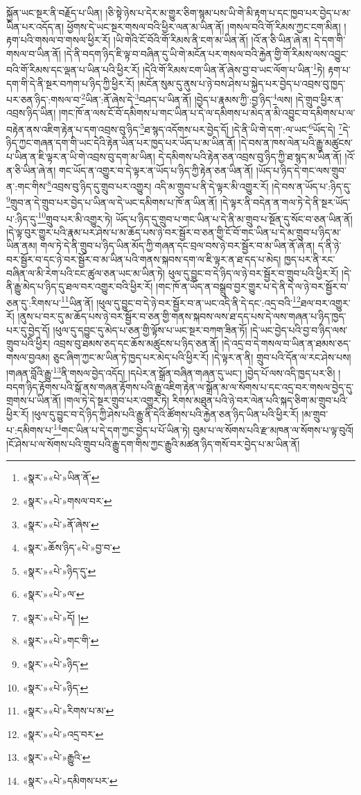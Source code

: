 སྐྱོན་ཡང་སྔར་ནི་བརྗོད་པ་ཡིན། །ཅི་སྟེ་ཉེས་པ་དེར་མ་གྱུར་ཅིག་སྙམ་པས་ཡི་གེ་མི་རྟག་པ་དང་ཁྱབ་པར་བྱེད་པ་མ་ཡིན་པར་འདོད་ན། ཕྱོགས་དེ་ཡང་སྔར་གསལ་བའི་ཕྱིར་ལན་མ་ཡིན་ནོ། །གསལ་བའི་གོ་རིམས་ཀྱང་ངག་མིན། །རྟག་པའི་གསལ་བ་གསལ་ཕྱིར་རོ། །ཡི་གེའི་ངོ་བོའི་གོ་རིམས་ནི་ངག་མ་ཡིན་ནོ། །འོ་ན་ཅི་ཡིན་ཞེ་ན། དེ་དག་གི་གསལ་བ་ཡིན་ནོ། །དེ་ནི་བདག་ཉིད་ཇི་ལྟ་བ་བཞིན་དུ་ཡི་གེ་མངོན་པར་གསལ་བའི་རྐྱེན་གྱི་གོ་རིམས་ལས་འབྱུང་བའི་གོ་རིམས་དང་ལྡན་པ་ཡིན་པའི་ཕྱིར་རོ། །དེའི་གོ་རིམས་ངག་ཡིན་ནོ་ཞེས་བྱ་བ་ཡང་ལོག་པ་ཡིན་\footnote{«སྣར་»«པེ་»ཡིན་ནོ་}ཏེ། རྟག་པ་དག་གི་དེ་ནི་སྔར་བཀག་པ་ཉིད་ཀྱི་ཕྱིར་རོ། །མངོན་སུམ་དུ་ནུས་པ་ཉེ་བས་ཤེས་པ་སྐྱེད་པར་བྱེད་པ་འབྲས་བུ་ཁྱད་པར་ཅན་ཉིད་:གསལ་བ་\footnote{«སྣར་»«པེ་»གསལ་བར་}ཡིན་:ནོ་ཞེས་དེ་\footnote{«སྣར་»«པེ་»ནོ་ཞེས་}བཤད་པ་ཡིན་ནོ། །བྱེད་པ་རྣམས་ཀྱི་:བྱ་ཉིད་\footnote{«སྣར་»ཆོས་ཉིད་«པེ་»བྱ་བ་}ལས། །དེ་གྲུབ་ཕྱིར་ན་འབྲས་ཉིད་ཡིན། །གང་ཁོ་ན་ལས་ངོ་བོ་དམིགས་པ་གང་ཡིན་པ་དེ་ལ་དམིགས་པ་མེད་ན་མི་འབྱུང་བ་དམིགས་པ་ལ་བརྟེན་ནས་འཇིག་རྟེན་པ་དག་འབྲས་བུ་ཉིད་\footnote{«སྣར་»«པེ་»ཉིད་དུ་}ཐ་སྙད་འདོགས་པར་བྱེད་དོ། །དེ་ནི་ཡི་གེ་དག་:ལ་ཡང་\footnote{«སྣར་»«པེ་»ལ་}ཡོད་དེ། \footnote{«སྣར་»«པེ་»དོ། ། }དེ་ཉིད་ཀྱང་གཞན་དག་གི་ཡང་དེའི་རྟེན་ཡིན་པར་ཁྱད་པར་ཡོད་པ་མ་ཡིན་ནོ། །དེ་བས་ན་ཁས་ལེན་པའི་རྒྱུ་མཚུངས་པ་ཡིན་ན་ཇི་ལྟར་ན་ཡི་གེ་འབྲས་བུ་དག་མ་ཡིན། དེ་དམིགས་པའི་རྟེན་ཅན་འབྲས་བུ་ཉིད་ཀྱི་ཐ་སྙད་མ་ཡིན་ནོ། །འོ་ན་ཅི་ཡིན་ཞེ་ན། གང་ཡོད་ན་འགྱུར་བ་དེ་ལྟར་ན་ཡོད་པ་ཉིད་ཀྱི་རྟེན་ཅན་ཡིན་ནོ། །ཡོད་པ་ཉིད་དེ་གང་ལས་གྲུབ་ན་:གང་གིས་\footnote{«སྣར་»«པེ་»གང་གི་}འབྲས་བུ་ཉིད་དུ་གྲུབ་པར་འགྱུར། འདི་མ་གྲུབ་པ་ནི་དེ་ལྟར་མི་འགྱུར་རོ། །དེ་བས་ན་ཡོད་པ་:ཉིད་དུ་\footnote{«སྣར་»«པེ་»ཉིད་}གྲུབ་ན་དེ་གྲུབ་པར་བྱེད་པ་ཡིན་ལ་དེ་ཡང་དམིགས་པ་ཁོ་ན་ཡིན་ནོ། །དེ་ལྟར་ནི་བདེན་ན་གལ་ཏེ་དེ་ནི་སྔར་ཡོད་པ་:ཉིད་དུ་\footnote{«སྣར་»«པེ་»ཉིད་}གྲུབ་པར་མི་འགྱུར་ཏེ། ཡོད་པ་ཉིད་དུ་གྲུབ་པ་གང་ཡིན་པ་དེ་ནི་མ་གྲུབ་པ་སྔོན་དུ་སོང་བ་ཅན་ཡིན་ནོ། །དེ་ལྟ་བུར་གྱུར་པའི་རྣམ་པར་ཤེས་པ་མ་ཆོད་པས་ཉེ་བར་སྦྱོར་བ་ཅན་གྱི་ངོ་བོ་གང་ཡིན་པ་དེ་མ་གྲུབ་པ་ཉིད་མ་ཡིན་ནམ། གལ་ཏེ་དེ་ནི་གྲུབ་པ་ཉིད་ཡིན་མོད་ཀྱི་གཞན་དང་བྲལ་བས་ཉེ་བར་སྦྱོར་བ་མ་ཡིན་ནོ་ཞེ་ན། ད་ནི་ཉེ་བར་སྦྱོར་བ་དང་ཉེ་བར་སྦྱོར་བ་མ་ཡིན་པའི་གནས་སྐབས་དག་ལ་ཇི་ལྟར་ན་ཐ་དད་པ་མེད། ཁྱད་པར་ནི་རང་བཞིན་ལ་མི་རེག་པའི་ངང་ཚུལ་ཅན་ཡང་མ་ཡིན་ཏེ། ཕུལ་དུ་བྱུང་བ་དེ་ཉིད་ལ་ཉེ་བར་སྦྱོར་བ་གྲུབ་པའི་ཕྱིར་རོ། །དེ་ནི་རྒྱུ་མེད་པ་ཉིད་དུ་ཐལ་བར་འགྱུར་བའི་ཕྱིར་རོ། །གང་ཁོ་ན་ཡོད་ན་བསྒྲུབ་བྱར་གྱུར་པ་དེ་ནི་དེ་ལ་ཉེ་བར་སྦྱོར་བ་ཅན་དུ་:རིགས་པ་\footnote{«སྣར་»«པེ་»རིགས་པ་མ་}ཡིན་ནོ། །ཕུལ་དུ་བྱུང་བ་དེ་ཉེ་བར་སྦྱོར་བ་ན་ཡང་འདི་ནི་དེ་དང་:འདྲ་བའི་\footnote{«སྣར་»«པེ་»འདྲ་བར་}ཐལ་བར་འགྱུར་རོ། །ནུས་པ་བར་དུ་མ་ཆོད་པས་ཉེ་བར་སྦྱོར་བ་ཅན་གྱི་གནས་སྐབས་ལས་ཐ་དད་པས་དེ་ལས་གཞན་པ་ཉིད་ཁྱད་པར་དུ་བྱེད་དོ། །ཕུལ་དུ་དབྱུང་དུ་མེད་པ་ཅན་གྱི་ལྟོས་པ་ཡང་སྔར་བཀག་ཟིན་ཏོ། །དེ་ཡང་བྱེད་པའི་བྱ་བ་ཉིད་ལས་གྲུབ་པའི་ཕྱིར། འབྲས་བུ་ཐམས་ཅད་དང་ཆོས་མཚུངས་པ་ཉིད་ཅན་ནོ། །དེ་འདྲ་བ་དེ་གསལ་བ་ཡིན་ན་ཐམས་ཅད་གསལ་བྱའམ། ཅུང་ཞིག་ཀྱང་མ་ཡིན་ཏེ་ཁྱད་པར་མེད་པའི་ཕྱིར་རོ། །དེ་ལྟར་ན་ནི། གྲུབ་པའི་དོན་ལ་རང་ཤེས་པས། །གཞན་བློའི་རྒྱུ་\footnote{«སྣར་»«པེ་»རྒྱུའི་}ནི་གསལ་བྱེད་འདོད། །དཔེར་ན་སྒྲོན་བཞིན་གཞན་དུ་ཡང་། །བྱེད་པོ་ལས་འདི་ཁྱད་པར་ཅི། །བདག་ཉིད་རྟོགས་པའི་སྒོ་ནས་གཞན་རྟོགས་པའི་རྒྱུ་འཇིག་རྟེན་ལ་སྒྲོན་མ་ལ་སོགས་པ་དང་འདྲ་བར་གསལ་བྱེད་དུ་གྲགས་པ་ཡིན་ནོ། །གལ་ཏེ་དེ་སྔར་གྲུབ་པར་འགྱུར་ཏེ། རིགས་མཐུན་པའི་ཉེ་བར་ལེན་པའི་སྐད་ཅིག་མ་གྲུབ་པའི་ཕྱིར་རོ། །ཕུལ་དུ་བྱུང་བ་དེ་ཉིད་ཀྱི་ཤེས་པའི་རྒྱུ་ནི་དེའི་ཚོགས་པའི་རྐྱེན་ཅན་ཉིད་ཡིན་པའི་ཕྱིར་རོ། །མ་གྲུབ་པ་:དམིགས་པ་\footnote{«སྣར་»«པེ་»དམིགས་པར་}གང་ཡིན་པ་དེ་དག་ཀྱང་བྱེད་པ་པོ་ཡིན་ཏེ། བུམ་པ་ལ་སོགས་པའི་རྫ་མཁན་ལ་སོགས་པ་ལྟ་བུའོ། །ངོ་ཤེས་པ་ལ་སོགས་པའི་གྲུབ་པའི་རྒྱུ་དག་གིས་ཀྱང་རྒྱུའི་མཚན་ཉིད་གསོ་བར་བྱེད་པ་མ་ཡིན་ནོ། 